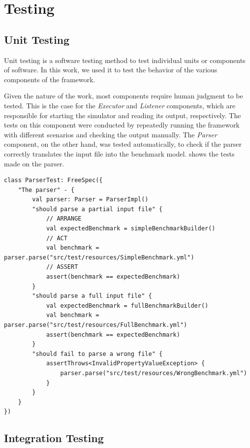 \documentclass[12pt,a4paper,openright,twoside]{book}
\begin{document}
\section{Testing}

\subsection{Unit Testing}
Unit testing is a software testing method to test individual units or components of software.
In this work, we used it to test the behavior of the various components of the framework.

Given the nature of the work, most components require human judgment to be tested. 
This is the case for the \emph{Executor} and \emph{Listener} components, which are responsible for starting the simulator and reading its output, respectively.
The tests on this component were conducted by repeatedly running the framework with different scenarios and checking the output manually.
The \emph{Parser} component, on the other hand, was tested automatically, to check if the parser correctly translates the input file into the benchmark model.
 shows the tests made on the parser.

\begin{lstlisting}[style=my-kotlin, language=my-kotlin, label={lst:parser-tests}, caption={Parser tests.}]
  class ParserTest: FreeSpec({
    "The parser" - {
        val parser: Parser = ParserImpl()
        "should parse a partial input file" {
            // ARRANGE
            val expectedBenchmark = simpleBenchmarkBuilder()
            // ACT
            val benchmark = parser.parse("src/test/resources/SimpleBenchmark.yml")
            // ASSERT
            assert(benchmark == expectedBenchmark)
        }
        "should parse a full input file" {
            val expectedBenchmark = fullBenchmarkBuilder()
            val benchmark = parser.parse("src/test/resources/FullBenchmark.yml")
            assert(benchmark == expectedBenchmark)
        }
        "should fail to parse a wrong file" {
            assertThrows<InvalidPropertyValueException> {
                parser.parse("src/test/resources/WrongBenchmark.yml")
            }
        }
    }
})
\end{lstlisting}

\subsection{Integration Testing}
\end{document}

